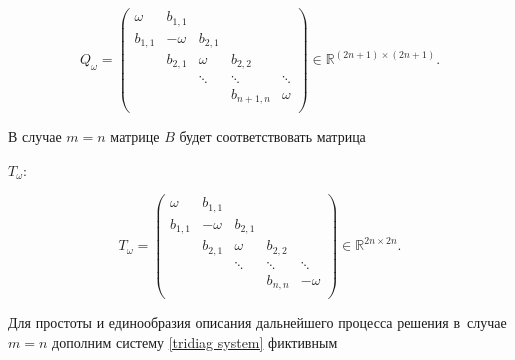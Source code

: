 \begin{equation}

\label{tridiag rectangle Q-matrix}

 Q_{\omega} = \left(

\begin{array}{cccccccc}

{\omega} & b_{1,1} & & & \\

b_{1,1} & {-\omega} & b_{2,1} & & \\

& b_{2,1} & {\omega} & b_{2,2} & \\

& & \ddots & \ddots & \ddots \\

& & & b_{n+1, n} & {\omega} \\

\end{array}

\right) \in {\mathbb{R}}^{(2n + 1) \times (2n + 1)}.

\end{equation}



В случае $m=n$ матрице $B$ будет соответствовать матрица

$T_{\omega}$:

\begin{equation}

\label{tridiag square T-matrix} T_{\omega} = \left(

\begin{array}{cccccccc}

{\omega} & b_{1,1} & & & \\

b_{1,1} & {-\omega} & b_{2,1} & & \\

& b_{2,1} & {\omega} & b_{2,2} & \\

& & \ddots & \ddots & \ddots \\

& &  & b_{n, n} & {-\omega} \\

\end{array}

\right) \in {\mathbb{R}}^{2n \times 2n}.

\end{equation}



Для простоты и единообразия описания дальнейшего процесса решения в~случае $m=n$ дополним систему \eqref{tridiag system} фиктивным

